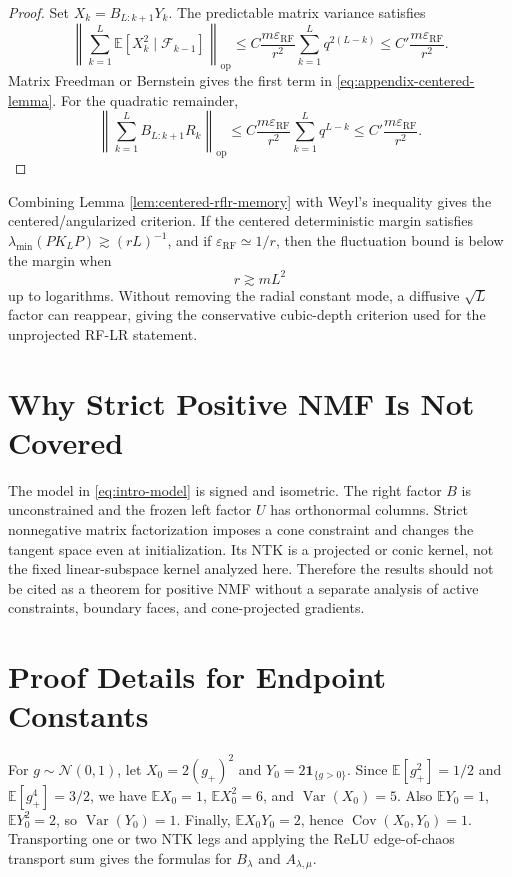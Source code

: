 \documentclass{article}
\newcommand{\E}{\mathbb E}
\newcommand{\Cov}{\operatorname{Cov}}
\newcommand{\Var}{\operatorname{Var}}
\newcommand{\op}{\mathrm{op}}
\newcommand{\eps}{\varepsilon}
\newcommand{\one}{\mathbf 1}
\newcommand{\RF}{\mathrm{RF}}
\begin{document}
\begin{proof}
Set \(X_k=B_{L:k+1}Y_k\). The predictable matrix variance satisfies
\begin{equation}
\left\|\sum_{k=1}^{L}\E[X_k^2\mid\mathcal F_{k-1}]\right\|_{\op}
\le
C\frac{m\eps_{\RF}}{r^2}\sum_{k=1}^{L}q^{2(L-k)}
\le C'\frac{m\eps_{\RF}}{r^2}.
\end{equation}
Matrix Freedman or Bernstein gives the first term in \eqref{eq:appendix-centered-lemma}. For the quadratic remainder,
\begin{equation}
\left\|\sum_{k=1}^{L}B_{L:k+1}R_k\right\|_{\op}
\le
C\frac{m\eps_{\RF}}{r^2}\sum_{k=1}^{L}q^{L-k}
\le C'\frac{m\eps_{\RF}}{r^2}.
\end{equation}
\end{proof}

Combining Lemma \ref{lem:centered-rflr-memory} with Weyl's inequality gives the centered/angularized criterion. If the centered deterministic margin satisfies \(\lambda_{\min}(PK_LP)\gtrsim (rL)^{-1}\), and if \(\eps_{\RF}\simeq 1/r\), then the fluctuation bound is below the margin when
\begin{equation}
r\gtrsim mL^2
\label{eq:appendix-centered-L2}
\end{equation}
up to logarithms. Without removing the radial constant mode, a diffusive \(\sqrt L\) factor can reappear, giving the conservative cubic-depth criterion used for the unprojected RF-LR statement.

\section{Why Strict Positive NMF Is Not Covered}
The model in \eqref{eq:intro-model} is signed and isometric. The right factor \(B\) is unconstrained and the frozen left factor \(U\) has orthonormal columns. Strict nonnegative matrix factorization imposes a cone constraint and changes the tangent space even at initialization. Its NTK is a projected or conic kernel, not the fixed linear-subspace kernel analyzed here. Therefore the results should not be cited as a theorem for positive NMF without a separate analysis of active constraints, boundary faces, and cone-projected gradients.

\section{Proof Details for Endpoint Constants}
For \(g\sim\mathcal N(0,1)\), let \(X_0=2(g_+)^2\) and \(Y_0=2\one_{\{g>0\}}\). Since \(\E[g_+^2]=1/2\) and \(\E[g_+^4]=3/2\), we have \(\E X_0=1\), \(\E X_0^2=6\), and \(\Var(X_0)=5\). Also \(\E Y_0=1\), \(\E Y_0^2=2\), so \(\Var(Y_0)=1\). Finally, \(\E X_0Y_0=2\), hence \(\Cov(X_0,Y_0)=1\). Transporting one or two NTK legs and applying the ReLU edge-of-chaos transport sum gives the formulas for \(B_\lambda\) and \(A_{\lambda,\mu}\).
\end{document}
